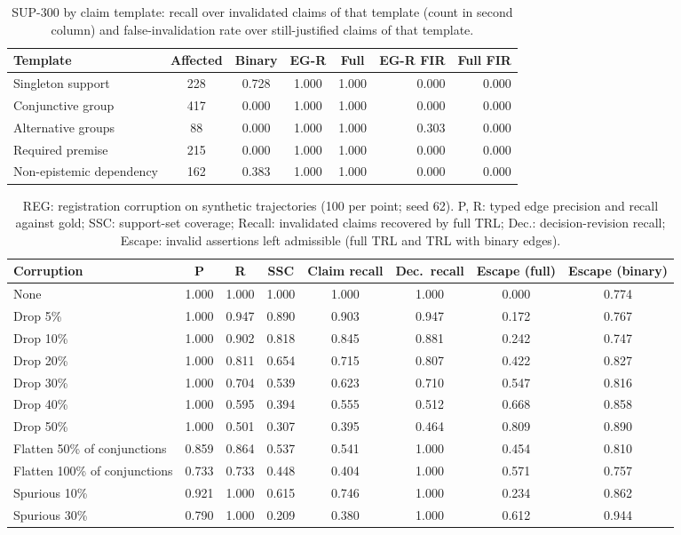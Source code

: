 \documentclass[journal]{IEEEtran}
\begin{document}
\begin{table}[!t]
\centering
\caption{SUP-300 by claim template: recall over invalidated claims of that template (count in second column) and false-invalidation rate over still-justified claims of that template.}
\label{tab:sup_tpl}
\scriptsize
\begin{tabular}{@{}lccccrr@{}}
\toprule
Template & Affected & Binary & EG-R & Full & EG-R FIR & Full FIR \\
\midrule
Singleton support & 228 & 0.728 & 1.000 & 1.000 & 0.000 & 0.000 \\
Conjunctive group & 417 & 0.000 & 1.000 & 1.000 & 0.000 & 0.000 \\
Alternative groups & 88 & 0.000 & 1.000 & 1.000 & 0.303 & 0.000 \\
Required premise & 215 & 0.000 & 1.000 & 1.000 & 0.000 & 0.000 \\
Non-epistemic dependency & 162 & 0.383 & 1.000 & 1.000 & 0.000 & 0.000 \\
\bottomrule
\end{tabular}
\end{table}


\begin{table}[!t]
\centering
\caption{REG: registration corruption on synthetic trajectories (100 per point; seed 62). P, R: typed edge precision and recall against gold; SSC: support-set coverage; Recall: invalidated claims recovered by full TRL; Dec.: decision-revision recall; Escape: invalid assertions left admissible (full TRL and TRL with binary edges).}
\label{tab:reg_full}
\scriptsize
\begin{tabular}{lccccccc}
\toprule
Corruption & P & R & SSC & Claim recall & Dec.\ recall & Escape (full) & Escape (binary) \\
\midrule
None & 1.000 & 1.000 & 1.000 & 1.000 & 1.000 & 0.000 & 0.774 \\
Drop 5\% & 1.000 & 0.947 & 0.890 & 0.903 & 0.947 & 0.172 & 0.767 \\
Drop 10\% & 1.000 & 0.902 & 0.818 & 0.845 & 0.881 & 0.242 & 0.747 \\
Drop 20\% & 1.000 & 0.811 & 0.654 & 0.715 & 0.807 & 0.422 & 0.827 \\
Drop 30\% & 1.000 & 0.704 & 0.539 & 0.623 & 0.710 & 0.547 & 0.816 \\
Drop 40\% & 1.000 & 0.595 & 0.394 & 0.555 & 0.512 & 0.668 & 0.858 \\
Drop 50\% & 1.000 & 0.501 & 0.307 & 0.395 & 0.464 & 0.809 & 0.890 \\
Flatten 50\% of conjunctions & 0.859 & 0.864 & 0.537 & 0.541 & 1.000 & 0.454 & 0.810 \\
Flatten 100\% of conjunctions & 0.733 & 0.733 & 0.448 & 0.404 & 1.000 & 0.571 & 0.757 \\
Spurious 10\% & 0.921 & 1.000 & 0.615 & 0.746 & 1.000 & 0.234 & 0.862 \\
Spurious 30\% & 0.790 & 1.000 & 0.209 & 0.380 & 1.000 & 0.612 & 0.944 \\
\bottomrule
\end{tabular}
\end{table}
\end{document}
